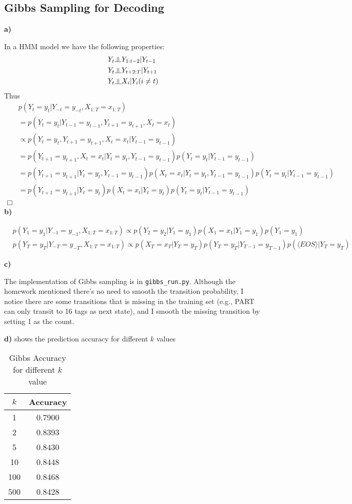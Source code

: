 \documentclass{article}
\newcommand{\indep}{\rotatebox[origin=c]{90}{$\models$}}
\begin{document}
\subsection{Gibbs Sampling for Decoding}
\textbf{a)}

In a HMM model we have the following properties:
\begin{align*}
&Y_t \indep Y_{1:t-2} | Y_{t-1}\\
&Y_t \indep Y_{t+2:T}| Y_{t+1}\\
&Y_t \indep X_i | Y_i (i \neq t)
\end{align*}
Thus
\begin{align*}
&p(Y_t = y_t|Y_{-t} = y_{-t}, X_{1:T} = x_{1:T}) \\
&= p(Y_t = y_t|Y_{t-1}=y_{t-1},Y_{t+1} = y_{t+1}, X_{t}=x_{t})\\
&\propto p(Y_t = y_t, Y_{t+1} = y_{t+1}, X_t = x_t | Y_{t-1} = y_{t-1})\\
&= p(Y_{t+1} = y_{t+1}, X_t = x_t | Y_t = y_t, Y_{t-1} = y_{t-1})p(Y_t = y_t|Y_{t-1} = y_{t-1}) \\
&=p(Y_{t+1}=y_{t+1}|Y_t = y_t, Y_{t-1} = y_{t-1})p(X_{t}=x_{t}|Y_t = y_t, Y_{t-1} = y_{t-1})p(Y_t = y_t|Y_{t-1} = y_{t-1})\\
&=p(Y_{t+1}=y_{t+1}|Y_t = y_t)p(X_{t}=x_{t}|Y_t = y_t)p(Y_t = y_t|Y_{t-1} = y_{t-1})\\
\Box
\end{align*}
\textbf{b)}

\begin{align*}
&p(Y_1 = y_1 |Y_{-1}=y_{-1}, X_{1:T} = x_{1:T}) \propto p(Y_2 = y_2|Y_1 = y_1)p(X_1 = x_1|Y_1 = y_1)p(Y_1 = y_1)\\
&p(Y_T = y_T|Y_{-T}=y_{-T},X_{1:T} = x_{1:T}) \propto p(X_T = x_T|Y_T = y_T)p(Y_T = y_T|Y_{T-1} = y_{T-1})p(\langle EOS\rangle|Y_T = y_T)
\end{align*}

\textbf{c)}

The implementation of Gibbs sampling is in \texttt{gibbs\_run.py}. Although the homework mentioned there's no need
to smooth the transition probability, I notice there are some transitions that is missing in the training set (e.g., PART 
can only transit to 16 tags as next state), and I smooth the missing transition by setting 1 as the count.

\textbf{d)}
 shows the prediction accuracy for different $k$ values
\begin{table}
\centering
\begin{tabular}{c|c}
\textbf{$k$}&\textbf{Accuracy}\\\hline
1 & 0.7900\\\hline
2 & 0.8393\\\hline
5 & 0.8430\\\hline
10 & 0.8448\\\hline
100 & 0.8468\\\hline
500 & 0.8428\\\hline

\end{tabular}
\caption{Gibbs Accuracy for different $k$ value}
\label{tab:gibbs}
\end{table}
\end{document}

